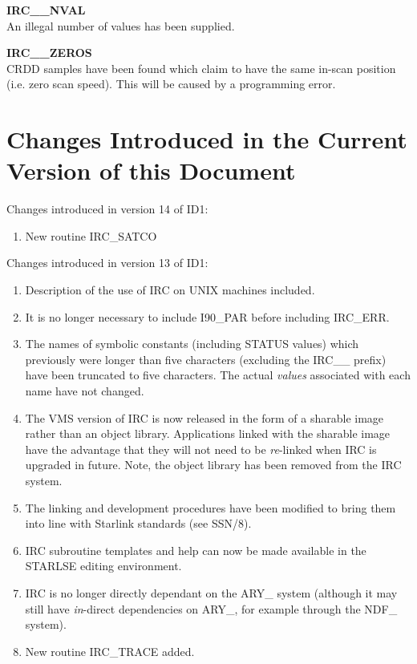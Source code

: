 \begin{description}
\item {\bf IRC\_\_NVAL      }\\
An illegal number of values has been supplied.

\item {\bf IRC\_\_ZEROS     }\\
CRDD samples have been found which claim to have the same in-scan position
(i.e. zero scan speed). This will be caused by a programming error.

\end{description}

\section {Changes Introduced in the Current Version of this Document}
\label {SEC:CHANGES}

Changes introduced in version 14 of ID1:
\begin {enumerate}
\item New routine IRC\_SATCO
\end {enumerate}

Changes introduced in version 13 of ID1:
\begin {enumerate}
\item Description of the use of IRC on UNIX machines included.
\item It is no longer necessary to include I90\_PAR before including
IRC\_ERR.
\item The names of symbolic constants (including STATUS values) which previously
were longer than five characters (excluding the IRC\_\_ prefix) have been
truncated to five characters. The actual {\em values} associated with each name
have not changed.
\item The VMS version of IRC is now released in the form of a sharable image
rather than an object library. Applications linked with the sharable image have
the advantage that they will not need to be {\em re}-linked when IRC is upgraded
in future. Note, the object library has been removed from the IRC system.
\item The linking and development procedures have been modified to bring them
into line with Starlink standards (see SSN/8).
\item IRC subroutine templates and help can now be made available in the STARLSE
editing environment.
\item IRC is no longer directly dependant on the ARY\_ system (although it may
still have {\em in}-direct dependencies on ARY\_, for example through the
NDF\_ system).
\item New routine IRC\_TRACE added.

\end {enumerate}


